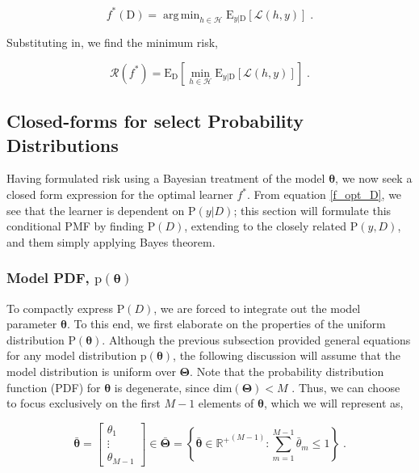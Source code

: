 \documentclass[12pt]{article}
\DeclareMathOperator*{\argmin}{arg\,min}
\begin{document}
\begin{equation} \label{f_opt_D}
f^*(\mathrm{D}) = \argmin_{h \in \mathcal{H}} \text{E}_{y|\mathrm{D}}\left[ \mathcal{L}(h,y) \right] \;.
\end{equation}

Substituting in, we find the minimum risk,

\begin{equation} \label{risk_min}
\mathcal{R}(f^*) = \text{E}_{\mathrm{D}} \left[ \min_{h \in \mathcal{H}} \text{E}_{y|\mathrm{D}}\left[ \mathcal{L}(h,y) \right] \right] \;.
\end{equation}




\subsection{Closed-forms for select Probability Distributions}

Having formulated risk using a Bayesian treatment of the model $\bm{\theta}$, we now seek a closed form expression for the optimal learner $f^*$. From equation \eqref{f_opt_D}, we see that the learner is dependent on $\text{P}(y|D)$; this section will formulate this conditional PMF by finding $\text{P}(D)$, extending to the closely related $\text{P}(y,D)$, and them simply applying Bayes theorem.


\subsubsection{Model PDF, $\text{p}(\bm{\theta})$}

To compactly express $\text{P}(D)$, we are forced to integrate out the model parameter $\bm{\theta}$. To this end, we first elaborate on the properties of the uniform distribution $\text{P}(\bm{\theta})$. Although the previous subsection provided general equations for any model distribution $\text{p}(\bm{\theta})$, the following discussion will assume that the model distribution is uniform over $\bm{\Theta}$. Note that the probability distribution function (PDF) for $\bm{\theta}$ is degenerate, since $\text{dim}(\bm{\Theta}) < M$ . Thus, we can choose to focus exclusively on the first $M-1$ elements of $\bm{\theta}$, which we will represent as,

\begin{equation}
\bar{\bm{\theta}} = \begin{bmatrix} \theta_1 \\ \vdots \\ \theta_{M-1} \end{bmatrix} \in \bar{\bm{\Theta}} = \left\{ \bar{\bm{\theta}} \in {\mathbb{R}^+}^{(M-1)}: \sum_{m=1}^{M-1} \bar{\theta}_m \leq 1 \right\} \;.
\end{equation}
\end{document}
